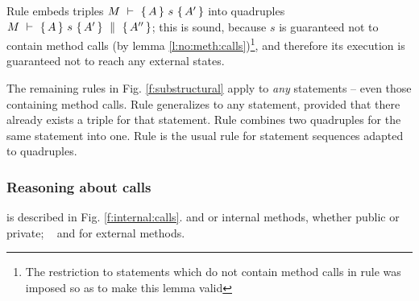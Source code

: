 {Rule {} embeds  triples  ${\hproves{M}  {A} {\ s\ }{A'} }$  into quadruples ${M\ \vdash\ \{\,A\, \} \ s\  \{\,A'\, \}\, \,\parallel\,\, \{\, A'' \, \} }$; this is sound, because $s$ is guaranteed not to contain method calls (by lemma \ref{l:no:meth:calls})\footnote{The restriction to statements which do not contain method calls in rule {} was imposed so as to make this lemma valid}, and therefore its execution is guaranteed not to reach any external states.

 
The remaining rules in Fig. \ref{f:substructural} apply to \emph{any} statements -- even those containing method calls.
 Rule {} generalizes {} to any statement, provided that  there already exists a triple for that statement.
Rule {} combines two quadruples for the same statement into one.
Rule   {}is the usual rule  for statement sequences  adapted to quadruples.



\subsubsection{Reasoning about   calls}
\label{s:calls}
is described in Fig. \ref{f:internal:calls}. {}  and {}  or internal methods, whether public or private;  \  {} 
and {} for  external methods.


}
